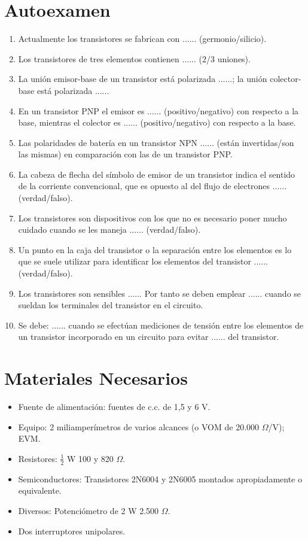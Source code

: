 \documentclass[a4paper,12pt]{article}
\begin{document}
\section{Autoexamen}
\begin{enumerate}
    \item Actualmente los transistores se fabrican con ...... (germonio/silicio).
    \item Los transistores de tres elementos contienen ...... (2/3 uniones).
    \item La unión emisor-base de un transistor está polarizada ......; la unión
          colector-base está polarizada ......
    \item En un transistor PNP el emisor es ...... (positivo/negativo) con respecto a la base,
          mientras el colector es ...... (positivo/negativo) con respecto a la base.
    \item Las polaridades de batería en un transistor NPN ...... (están invertidas/son las mismas)
          en comparación con las de un transistor PNP.
    \item La cabeza de flecha del símbolo de emisor de un transistor indica el sentido de la corriente
          convencional, que es opuesto al del flujo de electrones ...... (verdad/falso).
    \item Los transistores son dispositivos con los que no es necesario poner mucho cuidado cuando se
          les maneja ...... (verdad/falso).
    \item Un punto en la caja del transistor o la separación entre los elementos es lo que se suele
          utilizar para identificar los elementos del transistor ...... (verdad/falso).
    \item Los transistores son sensibles ...... Por tanto se deben emplear ...... cuando se sueldan
          los terminales del transistor en el circuito.
    \item Se debe: ...... cuando se efectúan mediciones de tensión entre los elementos de un transistor
          incorporado en un circuito para evitar ...... del transistor.
\end{enumerate}

\section{Materiales Necesarios}
\begin{itemize}
    \item Fuente de alimentación: fuentes de c.c. de 1,5 y 6 V.
    \item Equipo: 2 miliamperímetros de varios alcances (o VOM de 20.000 \(\Omega\)/V); EVM.
    \item Resistores: \( \frac{1}{2} \) W 100 y 820 \(\Omega\).
    \item Semiconductores: Transistores 2N6004 y 2N6005 montados apropiadamente o equivalente.
    \item Diversos: Potenciómetro de 2 W 2.500 \(\Omega\).
    \item Dos interruptores unipolares.
\end{itemize}
\end{document}
